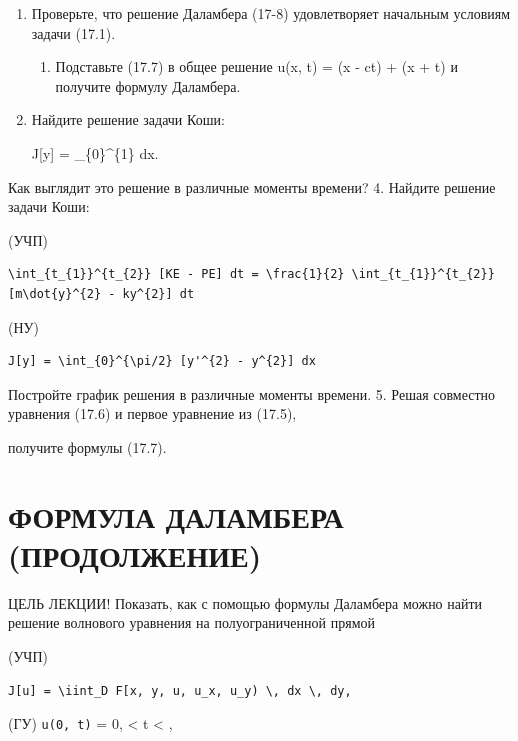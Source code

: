 \documentclass[
  ukrainian,
]{article}
\providecommand{\tightlist}{%
  \setlength{\itemsep}{0pt}\setlength{\parskip}{0pt}}
\begin{document}
\begin{enumerate}
\def\labelenumi{\arabic{enumi}.}
\item
  Проверьте, что решение Даламбера (17-8) удовлетворяет начальным
  условиям задачи (17.1).

  \begin{enumerate}
  \def\labelenumii{\arabic{enumii}.}
  \setcounter{enumii}{1}
  \tightlist
  \item
    Подставьте (17.7) в общее решение u(x, t) = \psi(x - ct) + \psi(x +
    \epsilon t) и получите формулу Даламбера.
  \end{enumerate}
\item
  Найдите решение задачи Коши:

  J{[}y{]} = \int\_\{0\}\^{}\{1\}  dx.
\end{enumerate}

Как выглядит это решение в различные моменты времени? 4. Найдите решение
задачи Коши:

(УЧП)

\begin{verbatim}
\int_{t_{1}}^{t_{2}} [KE - PE] dt = \frac{1}{2} \int_{t_{1}}^{t_{2}} [m\dot{y}^{2} - ky^{2}] dt
\end{verbatim}

(НУ)

\begin{verbatim}
J[y] = \int_{0}^{\pi/2} [y'^{2} - y^{2}] dx
\end{verbatim}

Постройте график решения в различные моменты времени. 5. Решая совместно
уравнения (17.6) и первое уравнение из (17.5),

получите формулы (17.7).

\section{ФОРМУЛА ДАЛАМБЕРА
(ПРОДОЛЖЕНИЕ)}\label{ux444ux43eux440ux43cux443ux43bux430-ux434ux430ux43bux430ux43cux431ux435ux440ux430-ux43fux440ux43eux434ux43eux43bux436ux435ux43dux438ux435}

ЦЕЛЬ ЛЕКЦИИ! Показать, как с помощью формулы Даламбера можно найти
решение волнового уравнения на полуограниченной прямой

(УЧП)

\begin{verbatim}
J[u] = \iint_D F[x, y, u, u_x, u_y) \, dx \, dy,
\end{verbatim}

(ГУ) \texttt{u(0,\ t)} = 0,  \textless{} t \textless{} \infty,
\end{document}
